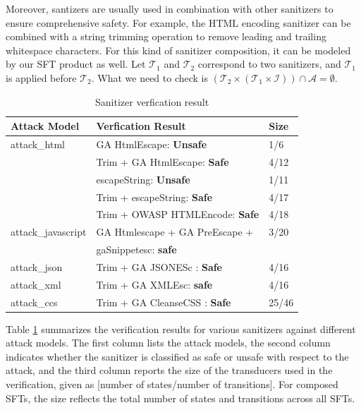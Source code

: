 Moreover, santizers are usually used in combination with other sanitizers to ensure comprehensive safety. For example, the HTML encoding sanitizer can be combined with a string trimming operation to remove leading and trailing whitespace characters. For this kind of sanitizer composition, it can be modeled by our SFT product as well. Let $\mathcal{T}_1$ and $\mathcal{T}_2$ correspond to two sanitizers, and $\mathcal{T}_1$ is applied before $\mathcal{T}_2$. What we need to check is $(\mathcal{T}_2 \times (\mathcal{T}_1 \times \mathcal{I})) \cap \mathcal{A} = \emptyset$.




\begin{table}[h]
  \centering
  \small
  \setlength{\tabcolsep}{4pt} %
  \begin{tabular}{p{2.2cm}ll} %
    \toprule
    \textbf{Attack Model} & \textbf{Verfication Result} & \textbf{Size} \\
    \midrule
    attack\_html           & GA HtmlEscape: \textbf{Unsafe} & 1/6\\
                           & Trim + GA HtmlEscape: \textbf{Safe} & 4/12 \\
                           & escapeString: \textbf{Unsafe} & 1/11 \\
                           & Trim + escapeString: \textbf{Safe} & 4/17 \\
                           & Trim + OWASP HTMLEncode: \textbf{Safe} & 4/18 \\
    \midrule
    attack\_javascript     & GA Htmlescape + GA PreEscape + & 3/20 \\
                           &  gaSnippetesc: \textbf{safe} & \\
    \midrule
    attack\_json           & Trim + GA JSONESc : \textbf{Safe} & 4/16\\
    \midrule
    attack\_xml            & Trim + GA XMLEsc: \textbf{safe} & 4/16\\
    \midrule
    attack\_ccs            & Trim + GA CleanseCSS : \textbf{Safe} & 25/46\\
    \bottomrule
  \end{tabular}
  \caption{Sanitizer verfication result}
  \label{tab:sanitizer_attack}
\end{table}

Table \ref{tab:sanitizer_attack} summarizes the verification results for various sanitizers against different attack models. The first column lists the attack models, the second column indicates whether the sanitizer is classified as safe or unsafe with respect to the attack, and the third column reports the size of the transducers used in the verification, given as [number of states/number of transitions]. For composed SFTs, the size reflects the total number of states and transitions across all SFTs.

